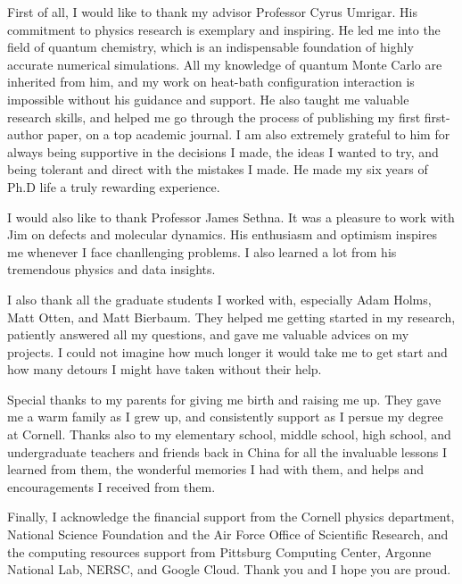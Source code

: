 \documentclass[phd,tocprelim]{cornell}
\begin{document}
\begin{acknowledgements}
First of all, I would like to thank my advisor Professor Cyrus Umrigar.
His commitment to physics research is exemplary and inspiring.
He led me into the field of quantum chemistry, which is an indispensable foundation of highly accurate numerical simulations.
All my knowledge of quantum Monte Carlo are inherited from him, and my work on heat-bath configuration interaction is impossible without his guidance and support.
He also taught me valuable research skills, and helped me go through the process of publishing my first first-author paper, on a top academic journal.
I am also extremely grateful to him for always being supportive in the decisions I made, the ideas I wanted to try, and being tolerant and direct with the mistakes I made.
He made my six years of Ph.D life a truly rewarding experience.

I would also like to thank Professor James Sethna.
It was a pleasure to work with Jim on defects and molecular dynamics.
His enthusiasm and optimism inspires me whenever I face chanllenging problems.
I also learned a lot from his tremendous physics and data insights.

I also thank all the graduate students I worked with, especially Adam Holms, Matt Otten, and Matt Bierbaum.
They helped me getting started in my research, patiently answered all my questions, and gave me valuable advices on my projects.
I could not imagine how much longer it would take me to get start and how many detours I might have taken without their help.

Special thanks to my parents for giving me birth and raising me up.
They gave me a warm family as I grew up, and consistently support as I persue my degree at Cornell.
Thanks also to my elementary school, middle school, high school, and undergraduate teachers and friends back in China for all the invaluable lessons I learned from them, the wonderful memories I had with them, and helps and encouragements I received from them.

Finally, I acknowledge the financial support from the Cornell physics department, National Science Foundation and the Air Force Office of Scientific Research, and the computing resources support from Pittsburg Computing Center, Argonne National Lab, NERSC, and Google Cloud.
Thank you and I hope you are proud.
\end{acknowledgements}

\contentspage
\tablelistpage
\figurelistpage
\end{document}
